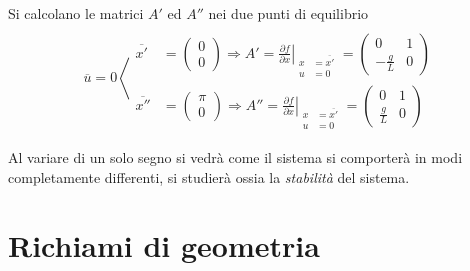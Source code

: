 Si calcolano le matrici $A'$ ed $A''$ nei due punti di equilibrio
$$
\overline{u} = 0 \left\langle
\begin{aligned}
 \\
 \overline{x'} &= \begin{pmatrix}
                  0 \\ 0
                 \end{pmatrix} \Rightarrow
                 A' = \left.\frac{\partial f}{\partial x}
                            \right|_{\begin{aligned}
                                      x &= \overline{x'}\\
                                      u &= 0
                                     \end{aligned}} =
                                     \begin{pmatrix}
                                      0 & 1 \\
                                      -\frac{g}{L} & 0
                                     \end{pmatrix}
\\
 \overline{x''} &= \begin{pmatrix}
                   \pi \\ 0
                  \end{pmatrix} \Rightarrow
                 A'' = \left.\frac{\partial f}{\partial x}
                            \right|_{\begin{aligned}
                                      x &= \overline{x'}\\
                                      u &= 0
                                     \end{aligned}} =
                                     \begin{pmatrix}
                                      0 & 1 \\
                                      \frac{g}{L} & 0
                                     \end{pmatrix}
\end{aligned} \right.
$$

Al variare di un solo segno si vedrà come il sistema si comporterà in modi
completamente differenti, si studierà ossia la \textit{stabilità} del sistema.

\section{Richiami di geometria}
